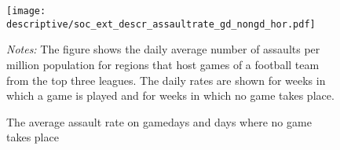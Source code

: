 \begin{figure}[t]\centering
	\caption{The average assault rate on gamedays and days where no game takes place}\label{fig_soc_ext:assault_rate_across_dows}
	\texttt{[image: descriptive/soc\_ext\_descr\_assaultrate\_gd\_nongd\_hor.pdf]}
	\begin{minipage}{0.9\linewidth}
		\scriptsize{\emph{Notes:} The figure shows the daily average number of assaults per million population for regions that host games of a football team from the top three leagues. The daily rates are shown for weeks in which a game is played and for weeks in which no game takes place.}
	\end{minipage}
\end{figure}